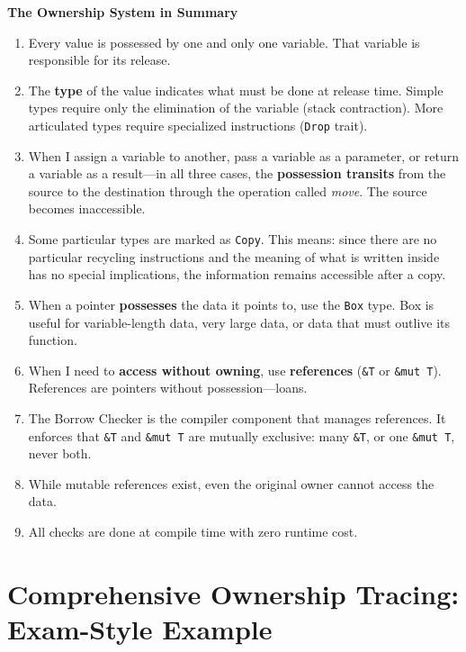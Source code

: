 \begin{exambox}
\textbf{The Ownership System in Summary} \\
\begin{enumerate}
    \item Every value is possessed by one and only one variable. That variable is responsible for its release.
    \item The \textbf{type} of the value indicates what must be done at release time. Simple types require only the elimination of the variable (stack contraction). More articulated types require specialized instructions (\texttt{Drop} trait).
    \item When I assign a variable to another, pass a variable as a parameter, or return a variable as a result---in all three cases, the \textbf{possession transits} from the source to the destination through the operation called \emph{move}. The source becomes inaccessible.
    \item Some particular types are marked as \texttt{Copy}. This means: since there are no particular recycling instructions and the meaning of what is written inside has no special implications, the information remains accessible after a copy.
    \item When a pointer \textbf{possesses} the data it points to, use the \texttt{Box} type. Box is useful for variable-length data, very large data, or data that must outlive its function.
    \item When I need to \textbf{access without owning}, use \textbf{references} (\texttt{\&T} or \texttt{\&mut T}). References are pointers without possession---loans.
    \item The Borrow Checker is the compiler component that manages references. It enforces that \texttt{\&T} and \texttt{\&mut T} are mutually exclusive: many \texttt{\&T}, or one \texttt{\&mut T}, never both.
    \item While mutable references exist, even the original owner cannot access the data.
    \item All checks are done at compile time with zero runtime cost.
\end{enumerate}
\end{exambox}

\section{Comprehensive Ownership Tracing: Exam-Style Example}


